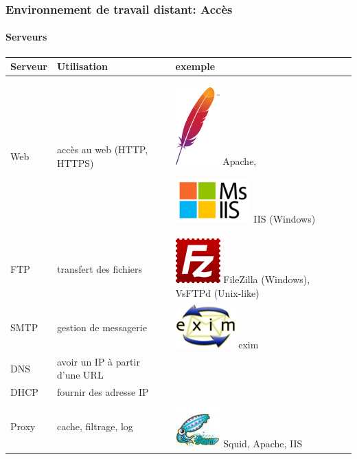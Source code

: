 \documentclass{beamer}
\begin{document}
\begin{frame}
\frametitle{Environnement de travail distant: Accès}
\framesubtitle{Serveurs}

\begin{tabular}{p{}p{}p{}}
	\hline\hline
	Serveur & Utilisation & exemple \\
	\hline\hline
	Web & accès au web (HTTP, HTTPS) & 
	\includegraphics[height=.8cm]{../img/Bweb01-environnement/apache.png} Apache, 
	
	\includegraphics[height=.8cm]{../img/Bweb01-environnement/iis.png} IIS (Windows) \\
	\hline
	FTP & transfert des fichiers & 
	\includegraphics[height=.8cm]{../img/Bweb01-environnement/filezilla.png} FileZilla (Windows), 
	VsFTPd (Unix-like) \\
	\hline
	SMTP & gestion de messagerie & 
	\includegraphics[height=.8cm]{../img/Bweb01-environnement/exim.png} exim \\
	\hline
	DNS & avoir un IP à partir d'une URL & \\
	\hline
	DHCP & fournir des adresse IP & \\\hline
	Proxy & cache, filtrage, log & 
	\includegraphics[height=.8cm]{../img/Bweb01-environnement/squid.jpg} Squid, Apache, IIS \\
	\hline\hline
\end{tabular}



\end{frame}
\end{document}
